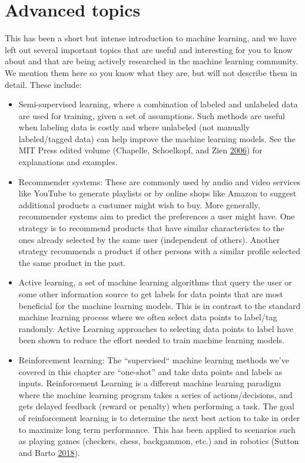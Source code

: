 \documentclass[]{krantz}
\begin{document}
\section{Advanced topics}\label{advanced-topics}

This has been a short but intense introduction to machine learning, and
we have left out several important topics that are useful and
interesting for you to know about and that are being actively researched
in the machine learning community. We mention them here so you know what
they are, but will not describe them in detail. These include:

\begin{itemize}
\item
  Semi-supervised learning, where a combination of labeled and unlabeled
  data are used for training, given a set of assumptions. Such methods
  are useful when labeling data is costly and where unlabeled (not
  manually labeled/tagged data) can help improve the machine learning
  models. See the MIT Press edited volume (Chapelle, Schoelkopf, and
  Zien \protect\hyperlink{ref-Chapelle2006}{2006}) for explanations and
  examples.
\item
  Recommender systems: These are commonly used by audio and video
  services like YouTube to generate playlists or by online shops like
  Amazon to suggest additional products a custumer might wish to buy.
  More generally, recommender systems aim to predict the preferences a
  user might have. One strategy is to recommend products that have
  similar characteristcs to the ones already selected by the same user
  (independent of others). Another strategy recommends a product if
  other persons with a similar profile selected the same product in the
  past.
\item
  Active learning, a set of machine learning algorithms that query the
  user or some other information source to get labels for data points
  that are most beneficial for the machine learning models. This is in
  contrast to the standard machine learning process where we often
  select data points to label/tag randomly. Active Learning approaches
  to selecting data points to label have been shown to reduce the effort
  needed to train machine learning models.
\item
  Reinforcement learning: The ``supervised`` machine learning methods
  we've covered in this chapter are ``one-shot'' and take data points
  and labels as inputs. Reinforcement Learning is a different machine
  learning paradigm where the machine learning program takes a series of
  actions/decisions, and gets delayed feedback (reward or penalty) when
  performing a task. The goal of reinforcement learning is to determine
  the next best action to take in order to maximize long term
  performance. This has been applied to scenarios such as playing games
  (checkers, chess, backgammon, etc.) and in robotics (Sutton and Barto
  \protect\hyperlink{ref-Sutton2018}{2018}).
\end{itemize}
\end{document}
